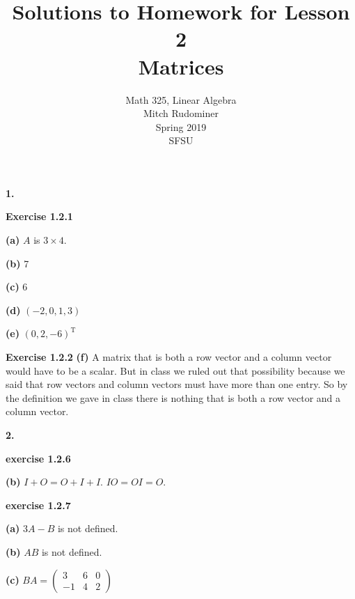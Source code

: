 \documentclass[oneside,12pt]{amsart}
\begin{document}
\title{Solutions to Homework for Lesson 2 \\ Matrices}
\author{Math 325, Linear Algebra \\ Mitch Rudominer \\ Spring 2019 \\ SFSU }
\date{}

\maketitle


\textbf{1.}

\smallskip

\textbf{Exercise 1.2.1}

\smallskip

\textbf{(a)} $A$ is $3\times 4$.

\smallskip

\textbf{(b)} 7

\smallskip

\textbf{(c)} 6

\smallskip

\textbf{(d)} $(-2, 0, 1, 3)$

\smallskip

\textbf{(e)} $(0,2, -6)^{\text{T}}$

\smallskip

\textbf{Exercise 1.2.2}
\smallskip
\textbf{(f)} A matrix that is both a row vector and a column vector would
have to be a scalar. But in class we ruled out that possibility because we said
that row vectors and column vectors must have more than one entry. So by the
definition we gave in class there is nothing that is both a row vector and
a column vector.

\smallskip

\textbf{2.}

\smallskip

\textbf{exercise 1.2.6}

\smallskip

\textbf{(b)} $I + O = O + I + I$. $I O = O I = O$.

\smallskip

\textbf{exercise 1.2.7}

\textbf{(a)} $3A - B$ is not defined.

\smallskip

\textbf{(b)} $AB$ is not defined.

\smallskip

\textbf{(c)} $BA =
\begin{pmatrix}
3 & 6 & 0 \\
-1 & 4 & 2
\end{pmatrix}
$
\end{document}
